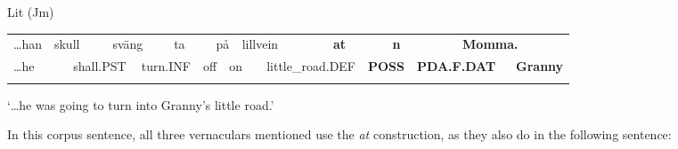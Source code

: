 
\begin{listWWNumileveli}
\item {}

\begin{styleExample}
Lit (Jm)

\end{styleExample}

\end{listWWNumileveli}

\begin{tabular}{llllllllllllllllll}
\lsptoprule
…han & \multicolumn{2}{l}{skull

} & \multicolumn{2}{l}{sväng

} & \multicolumn{2}{l}{ta

} & \multicolumn{2}{l}{på

} & \multicolumn{2}{l}{lillvein

} & \multicolumn{2}{l}{{\bfseries at}

} & \multicolumn{2}{l}{{\bfseries n}

} & \multicolumn{2}{l}{{\bfseries Momma.}

} & \\
\multicolumn{2}{l}{…he

} & \multicolumn{2}{l}{shall.PST

} & \multicolumn{2}{l}{turn.INF

} & \multicolumn{2}{l}{off

} & \multicolumn{2}{l}{on

} & \multicolumn{2}{l}{little\_road.DEF

} & \multicolumn{2}{l}{{\bfseries POSS}

} & \multicolumn{2}{l}{{\bfseries PDA.F.DAT}

} & \multicolumn{2}{l}{{\bfseries Granny}

}\\
\lspbottomrule
\end{tabular}

\begin{styleTranslation}
‘…he was going to turn into Granny’s little road.’

\end{styleTranslation}

\begin{styleBodyTextFirst}
In this corpus sentence, all three vernaculars mentioned use the \textit{at} construction, as they also do in the following sentence:

\end{styleBodyTextFirst}

